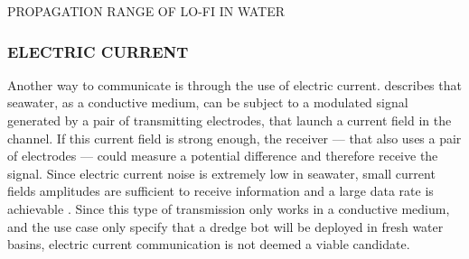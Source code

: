 \begin{RoyalFigure}[!htb, label=fig:propagationrange]{PROPAGATION RANGE OF LO-FI IN WATER}
\end{RoyalFigure}

\subsubsection{ELECTRIC CURRENT}\label{sec:ec}
 Another way to communicate is through the use of electric current. \citet{hagman_elias_design_2009} describes that seawater, as a conductive medium, can be subject to a modulated signal generated by a pair of transmitting electrodes, that launch a current field in the channel. If this current field is strong enough, the receiver --- that also uses a pair of electrodes --- could measure a potential difference and therefore receive the signal. Since electric current noise is extremely low in seawater, small current fields amplitudes are sufficient to receive information and a large data rate is achievable \cite{hagman_elias_design_2009}.
 Since this type of transmission only works in a conductive medium, and the use case only specify that a dredge bot will be deployed in fresh water basins, electric current communication is not deemed a viable candidate.

